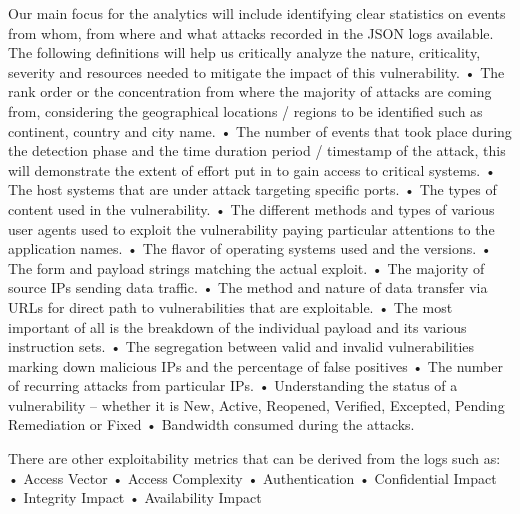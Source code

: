 Our main focus for the analytics will include identifying clear statistics on events from whom, from where and what attacks recorded in the JSON logs available. The following definitions will help us critically analyze the nature, criticality, severity and resources needed to mitigate the impact of this vulnerability.  
•	The rank order or the concentration from where the majority of attacks are coming from, considering the geographical locations / regions to be identified such as continent, country and city name. 
•	The number of events that took place during the detection phase and the time duration period / timestamp of the attack, this will demonstrate the extent of effort put in to gain access to critical systems.
•	The host systems that are under attack targeting specific ports.
•	The types of content used in the vulnerability.
•	The different methods and types of various user agents used to exploit the vulnerability paying particular attentions to the application names.
•	The flavor of operating systems used and the versions.
•	The form and payload strings matching the actual exploit.
•	The majority of source IPs sending data traffic.
•	The method and nature of data transfer via URLs for direct path to vulnerabilities that are exploitable.
•	The most important of all is the breakdown of the individual payload and its various instruction sets.
•	The segregation between valid and invalid vulnerabilities marking down malicious IPs and the percentage of false positives
•	The number of recurring attacks from particular IPs.
•	Understanding the status of a vulnerability – whether it is New, Active, Reopened, Verified, Excepted, Pending Remediation or Fixed
•	Bandwidth consumed during the attacks.

There are other exploitability metrics that can be derived from the logs such as:
•	Access Vector
•	Access Complexity
•	Authentication
•	Confidential Impact
•	Integrity Impact
•	Availability Impact
